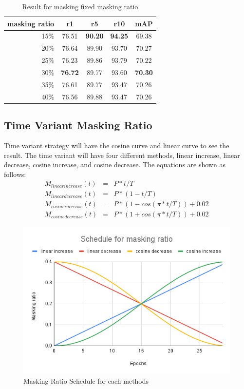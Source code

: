 \begin{table}[htbp]
\centering
  \caption{Result for masking fixed masking ratio}
  \begin{tabular}{rcccc}
    masking ratio & r1 & r5 & r10 & mAP\\ \hline
    15\% & 76.51 & \textbf{90.20} & \textbf{94.25} & 69.38 \\
    20\% & 76.64 & 89.90 & 93.70 & 70.27 \\
    25\% & 76.23 & 89.86 & 93.79 & 70.22 \\
    30\% & \textbf{76.72} & 89.77 & 93.60 & \textbf{70.30} \\
    35\% & 76.61 & 89.77 & 93.47 & 70.26 \\
    40\% & 76.56 & 89.88 & 93.47 & 70.26
  \end{tabular}
\end{table}

\subsection{Time Variant Masking Ratio}
Time variant strategy will have the cosine curve and linear curve to see the result. The time variant will have four different methods, linear increase, linear decrease, cosine increase, and cosine decrease. The equations are shown as follows:
\begin{eqnarray}
M_{linear increase}\left( t \right) &=& P*t/T \\
M_{linear decrease}\left( t \right) &=& P*\left(1-t/T\right) \\
M_{cosine increase}\left(t\right) &=& P*\left(1-cos\left(\pi*t/T\right)\right) + 0.02 \\
M_{cosine decrease}\left(t\right) &=& P*\left(1+cos\left(\pi*t/T\right)\right) + 0.02 
\end{eqnarray}

\begin{figure}[htbp]
  \includegraphics[width=\linewidth]{img/Schedule_masking_ratio.png}
  \caption{Masking Ratio Schedule for each methods}
  \label{img:masking_ratio_scheduler}
\end{figure}

